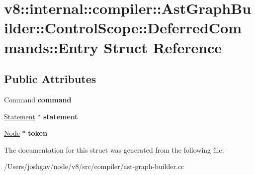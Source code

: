 \hypertarget{structv8_1_1internal_1_1compiler_1_1_ast_graph_builder_1_1_control_scope_1_1_deferred_commands_1_1_entry}{}\section{v8\+:\+:internal\+:\+:compiler\+:\+:Ast\+Graph\+Builder\+:\+:Control\+Scope\+:\+:Deferred\+Commands\+:\+:Entry Struct Reference}
\label{structv8_1_1internal_1_1compiler_1_1_ast_graph_builder_1_1_control_scope_1_1_deferred_commands_1_1_entry}
\subsection*{Public Attributes}
\begin{DoxyCompactItemize}
\item 
Command {\bfseries command}\hypertarget{structv8_1_1internal_1_1compiler_1_1_ast_graph_builder_1_1_control_scope_1_1_deferred_commands_1_1_entry_ae64e25ecfc85f09354b23bdebd23585b}{}\label{structv8_1_1internal_1_1compiler_1_1_ast_graph_builder_1_1_control_scope_1_1_deferred_commands_1_1_entry_ae64e25ecfc85f09354b23bdebd23585b}

\item 
\hyperlink{classv8_1_1internal_1_1_statement}{Statement} $\ast$ {\bfseries statement}\hypertarget{structv8_1_1internal_1_1compiler_1_1_ast_graph_builder_1_1_control_scope_1_1_deferred_commands_1_1_entry_afd1be11cea0cec240bccda392a8bd926}{}\label{structv8_1_1internal_1_1compiler_1_1_ast_graph_builder_1_1_control_scope_1_1_deferred_commands_1_1_entry_afd1be11cea0cec240bccda392a8bd926}

\item 
\hyperlink{classv8_1_1internal_1_1compiler_1_1_node}{Node} $\ast$ {\bfseries token}\hypertarget{structv8_1_1internal_1_1compiler_1_1_ast_graph_builder_1_1_control_scope_1_1_deferred_commands_1_1_entry_a20dfb562ab759c21ddeb68a9cbb3920c}{}\label{structv8_1_1internal_1_1compiler_1_1_ast_graph_builder_1_1_control_scope_1_1_deferred_commands_1_1_entry_a20dfb562ab759c21ddeb68a9cbb3920c}

\end{DoxyCompactItemize}


The documentation for this struct was generated from the following file\+:\begin{DoxyCompactItemize}
\item 
/\+Users/joshgav/node/v8/src/compiler/ast-\/graph-\/builder.\+cc\end{DoxyCompactItemize}
